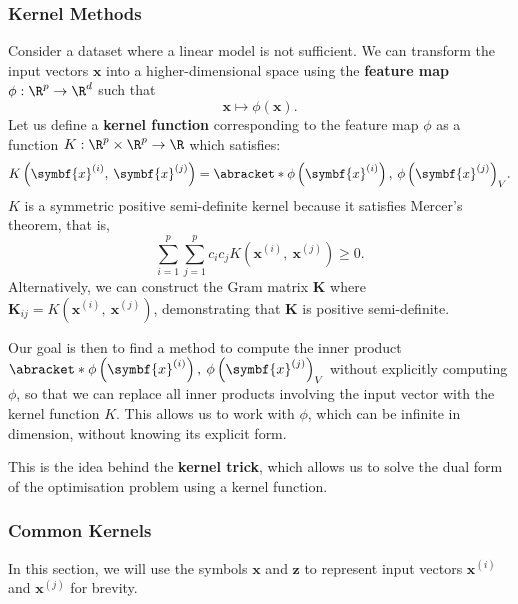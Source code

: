 \documentclass{article}
\begin{document}
\subsubsection{Kernel Methods}
Consider a dataset where a linear model is not sufficient. We can
transform the input vectors \(\symbf{x}\) into a higher-dimensional
space using the \textbf{feature map} \(\phi: \R^p \to \R^d\) such that
\begin{equation*}
    \symbf{x} \mapsto \phi\left( \symbf{x} \right).
\end{equation*}
Let us define a \textbf{kernel function} corresponding to the
feature map \(\phi\) as a function \(K: \R^p \times \R^p \to \R\) which
satisfies:
\begin{equation*}
    K\left( \symbf{x}^{\left( i \right)},\: \symbf{x}^{\left( j \right)} \right) = \abracket*{\phi\left( \symbf{x}^{\left( i \right)} \right),\: \phi\left( \symbf{x}^{\left( j \right)} \right)}_V.
\end{equation*}
\(K\) is a symmetric positive semi-definite kernel because it satisfies
Mercer's theorem, that is,
\begin{equation*}
    \sum_{i = 1}^p \sum_{j = 1}^p c_i c_j K\left( \symbf{x}^{\left( i \right)},\: \symbf{x}^{\left( j \right)} \right) \geqslant 0.
\end{equation*}
Alternatively, we can construct the Gram matrix \(\symbf{K}\) where
\(\symbf{K}_{ij} = K\left( \symbf{x}^{\left( i \right)},\: \symbf{x}^{\left( j \right)} \right)\),
demonstrating that \(\symbf{K}\) is positive semi-definite.

Our goal is then to find a method to compute the inner product
\(\abracket*{\phi\left( \symbf{x}^{\left( i \right)} \right),\:
\phi\left( \symbf{x}^{\left( j \right)} \right)}_V\) without explicitly
computing \(\phi\), so that we can replace all inner products involving
the input vector with the kernel function \(K\). This allows us to work
with \(\phi\), which can be infinite in dimension, without knowing its
explicit form.

This is the idea behind the \textbf{kernel trick}, which allows us to
solve the dual form of the optimisation problem using a kernel
function.
\subsubsection{Common Kernels}
In this section, we will use the symbols \(\symbf{x}\) and
\(\symbf{z}\) to represent input vectors \(\symbf{x}^{\left( i
\right)}\) and \(\symbf{x}^{\left( j \right)}\) for brevity.
\end{document}
